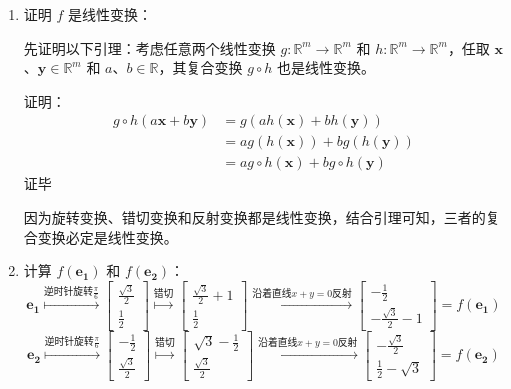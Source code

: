 	\begin{solution}
		\begin{enumerate}
			\item 证明 $f$ 是线性变换：
			
			先证明以下引理：考虑任意两个线性变换 $g:\mathbb{R}^m\rightarrow\mathbb{R}^m$ 和 $h:\mathbb{R}^m\rightarrow\mathbb{R}^m$，任取 $\boldsymbol{x}$、$\boldsymbol{y}\in\mathbb{R}^m$ 和 $a$、$b\in\mathbb{R}$，其复合变换 $g\circ h$ 也是线性变换。
			
			证明：\begin{align*}
				g\circ h(a\boldsymbol{x}+b\boldsymbol{y})&=g(ah(\boldsymbol{x})+bh(\boldsymbol{y}))\\
				&=ag(h(\boldsymbol{x}))+bg(h(\boldsymbol{y}))\\
				&=ag\circ h(\boldsymbol{x}) + bg\circ h(\boldsymbol{y})
			\end{align*}
			证毕
			
			因为旋转变换、错切变换和反射变换都是线性变换，结合引理可知，三者的复合变换必定是线性变换。
			
			\item 计算 $f(\boldsymbol{e_1})$ 和 $f(\boldsymbol{e_2})$：
			\[
				\boldsymbol{e_1}\stackrel{\text{逆时针旋转}\frac{\pi}{6}}{\longmapsto}\begin{bmatrix}
					\frac{\sqrt{3}}{2}\\\frac{1}{2}
				\end{bmatrix}\stackrel{\text{错切}}{\longmapsto}\begin{bmatrix}
				\frac{\sqrt{3}}{2}+1\\\frac{1}{2}
				\end{bmatrix}\stackrel{\text{沿着直线} x+y=0 \text{反射}}{\longmapsto}\begin{bmatrix}
				-\frac{1}{2}\\-\frac{\sqrt{3}}{2}-1
				\end{bmatrix}=f(\boldsymbol{e_1})
			\]
			\[
					\boldsymbol{e_2}\stackrel{\text{逆时针旋转}\frac{\pi}{6}}{\longmapsto}\begin{bmatrix}
						-\frac{1}{2}\\\frac{\sqrt{3}}{2}
					\end{bmatrix}\stackrel{\text{错切}}{\longmapsto}\begin{bmatrix}
						\sqrt{3}-\frac{1}{2}\\\frac{\sqrt{3}}{2}
					\end{bmatrix}\stackrel{\text{沿着直线} x+y=0 \text{反射}}{\longmapsto}\begin{bmatrix}
						-\frac{\sqrt{3}}{2}\\\frac{1}{2}-\sqrt{3}
					\end{bmatrix}=f(\boldsymbol{e_2})
			\]
			

\end{enumerate}
\end{solution}
